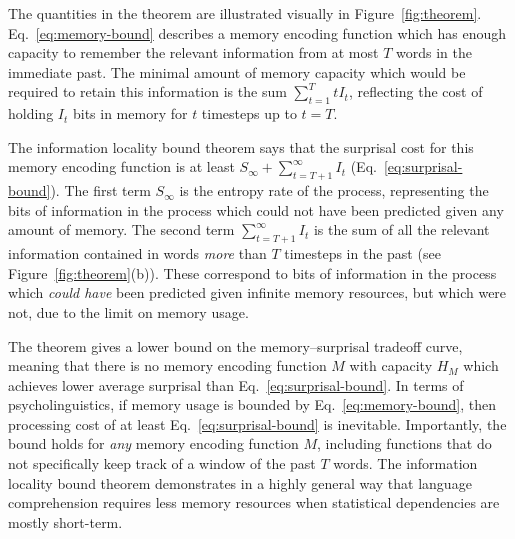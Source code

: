 The quantities in the theorem are illustrated visually in Figure~\ref{fig:theorem}. Eq.~\ref{eq:memory-bound} describes a memory encoding function which has enough capacity to remember the relevant information from at most $T$ words in the immediate past. The minimal amount of memory capacity which would be required to retain this information is the sum $\sum_{t=1}^T t I_t$, reflecting the cost of holding $I_t$ bits in memory for $t$ timesteps up to $t=T$. 

The information locality bound theorem says that the surprisal cost for this memory encoding function is at least $S_\infty + \sum_{t=T+1}^\infty I_t$ (Eq.~\ref{eq:surprisal-bound}). The first term $S_\infty$ is the entropy rate of the process, representing the bits of information in the process which could not have been predicted given any amount of memory. The second term $\sum_{t=T+1}^\infty I_t$ is the sum of all the relevant information contained in words \emph{more} than $T$ timesteps in the past (see Figure~\ref{fig:theorem}(b)). These correspond to bits of information in the process which \emph{could have} been predicted given infinite memory resources, but which were not, due to the limit on memory usage.

The theorem gives a lower bound on the memory--surprisal tradeoff curve, meaning that there is no memory encoding function $M$ with capacity $H_M$ which achieves lower average surprisal than Eq.~\ref{eq:surprisal-bound}. In terms of psycholinguistics, if memory usage is bounded by Eq.~\ref{eq:memory-bound}, then processing cost of at least Eq.~\ref{eq:surprisal-bound} is inevitable.
Importantly, the bound holds for \emph{any} memory encoding function $M$, including functions that do not specifically keep track of a window of the past $T$ words.
The information locality bound theorem demonstrates in a highly general way that language comprehension requires less memory resources when statistical dependencies are mostly short-term. 

